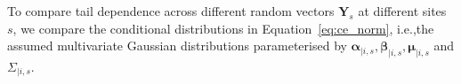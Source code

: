 \documentclass[12pt,compact]{article}
\DeclareMathOperator{\CE}{\mathrm{CE}}
\begin{document}
To compare tail dependence across different random vectors $\symbf{Y}_{s}$ at different sites $s$, we compare the conditional distributions in Equation~\eqref{eq:ce_norm}, i.e.,\@ the assumed multivariate Gaussian distributions parameterised by $\symbf{\alpha}_{\mid i, s},\symbf{\beta}_{\mid i, s},\symbf{\mu}_{\mid i, s}$ and $\Sigma_{\mid i, s}$. %
\end{document}
